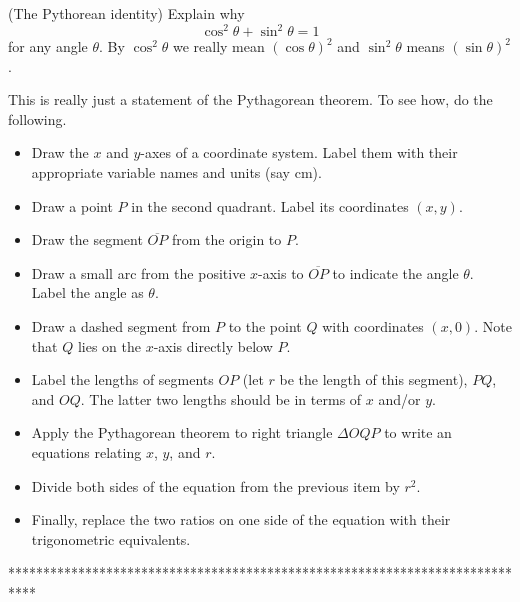 \documentclass{ximera}
\begin{document}
\begin{question} \label{Q234234hg:Cosine}
(The Pythorean identity) Explain why
\[
  \cos^2\theta + \sin^2 \theta = 1
\]
for any angle $\theta$. By $\cos^2\theta$ we really mean  $(\cos \theta)^2$ and $\sin^2\theta$ means $(\sin\theta)^2$.

\begin{explanation}
This is really just a statement of the Pythagorean theorem. To see how, do the following.
\begin{itemize}

\item{Draw the $x$ and $y$-axes of a coordinate system. Label them with their appropriate variable names and units (say cm).}

\item{Draw a point $P$ in the second quadrant. Label its coordinates $(x,y)$.}

\item{Draw the segment $\overline{OP}$ from the origin to $P$.}

\item{Draw a small arc from the positive $x$-axis to $\overline{OP}$ to indicate the angle $\theta$. Label the angle as $\theta$.}

\item{Draw a dashed segment from $P$ to the point $Q$ with coordinates $(x,0)$. Note that $Q$ lies on the $x$-axis directly below $P$.}

\item{Label the lengths of segments $OP$ (let $r$ be the length of this segment), $PQ$, and $OQ$. The latter two lengths should be in terms of $x$ and/or $y$.}

\item{Apply the Pythagorean theorem to right triangle $\Delta OQP$ to write an equations relating $x$, $y$, and $r$.}

\item{Divide both sides of the equation from the previous item by $r^2$.}

\item{Finally, replace the two ratios on one side of the equation with their trigonometric equivalents.}



\end{itemize}
\end{explanation}

\end{question}

****************************************************************************
\fi
\end{document}

